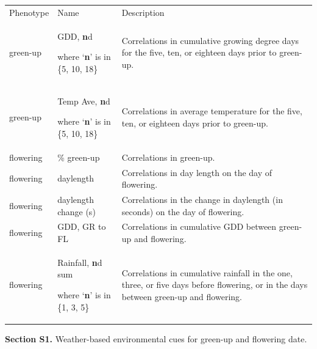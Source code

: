 \documentclass[
  letterpaper,
  DIV=11,
  numbers=noendperiod]{scrartcl}
\begin{document}
\begin{longtable}[]{@{}
  >{\raggedright\arraybackslash}p{}
  >{\raggedright\arraybackslash}p{}
  >{\raggedright\arraybackslash}p{}@{}}
\toprule\noalign{}
\endhead
\bottomrule\noalign{}
\endlastfoot
Phenotype & Name & Description \\
green-up & GDD, \textbf{n}d

where `\textbf{n}' is in \{5, 10, 18\} & Correlations in cumulative
growing degree days for the five, ten, or eighteen days prior to
green-up. \\
green-up & Temp Ave, \textbf{n}d

where `\textbf{n}' is in \{5, 10, 18\} & Correlations in average
temperature for the five, ten, or eighteen days prior to green-up. \\
flowering & 50\% green-up & Correlations in green-up. \\
flowering & daylength & Correlations in day length on the day of
flowering. \\
flowering & daylength change (s) & Correlations in the change in
daylength (in seconds) on the day of flowering. \\
flowering & GDD, GR to FL & Correlations in cumulative GDD between
green-up and flowering. \\
flowering & Rainfall, \textbf{n}d sum

where `\textbf{n}' is in \{1, 3, 5\} & Correlations in cumulative
rainfall in the one, three, or five days before flowering, or in the
days between green-up and flowering. \\
\end{longtable}

\hfill\break
\hfill\break

\textbf{Section S1.} Weather-based environmental cues for green-up and
flowering date.

\hfill\break
\end{document}
